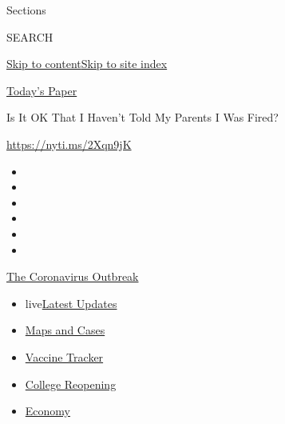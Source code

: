 Sections

SEARCH

\protect\hyperlink{site-content}{Skip to
content}\protect\hyperlink{site-index}{Skip to site index}

\href{https://myaccount.nytimes.com/auth/login?response_type=cookie\&client_id=vi}{}

\href{https://www.nytimes.com/section/todayspaper}{Today's Paper}

Is It OK That I Haven't Told My Parents I Was Fired?

\url{https://nyti.ms/2Xqn9jK}

\begin{itemize}
\item
\item
\item
\item
\item
\item
\end{itemize}

\href{https://www.nytimes.com/news-event/coronavirus?action=click\&pgtype=Article\&state=default\&region=TOP_BANNER\&context=storylines_menu}{The
Coronavirus Outbreak}

\begin{itemize}
\tightlist
\item
  live\href{https://www.nytimes.com/2020/08/04/world/coronavirus-cases.html?action=click\&pgtype=Article\&state=default\&region=TOP_BANNER\&context=storylines_menu}{Latest
  Updates}
\item
  \href{https://www.nytimes.com/interactive/2020/us/coronavirus-us-cases.html?action=click\&pgtype=Article\&state=default\&region=TOP_BANNER\&context=storylines_menu}{Maps
  and Cases}
\item
  \href{https://www.nytimes.com/interactive/2020/science/coronavirus-vaccine-tracker.html?action=click\&pgtype=Article\&state=default\&region=TOP_BANNER\&context=storylines_menu}{Vaccine
  Tracker}
\item
  \href{https://www.nytimes.com/2020/08/02/us/covid-college-reopening.html?action=click\&pgtype=Article\&state=default\&region=TOP_BANNER\&context=storylines_menu}{College
  Reopening}
\item
  \href{https://www.nytimes.com/live/2020/08/04/business/stock-market-today-coronavirus?action=click\&pgtype=Article\&state=default\&region=TOP_BANNER\&context=storylines_menu}{Economy}
\end{itemize}

